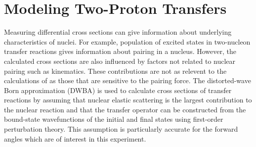\section{Modeling Two-Proton Transfers}

Measuring differential cross sections can give information about underlying characteristics of nuclei.  For example, population of excited \zp states in two-nucleon transfer reactions gives information about pairing in a nucleus.  However, the calculated cross sections are also influenced by factors not related to nuclear pairing such as kinematics.  These contributions are not as relevent to the calculations of \NME as those that are sensitive to the pairing force.  The distorted-wave Born approximation (DWBA) is used to calculate cross sections of transfer reactions by assuming that nuclear elastic scattering is the largest contribution to the nuclear reaction and that the transfer operator can be constructed from the bound-state wavefunctions of the initial and final states using first-order perturbation theory.  This assumption is particularly accurate for the forward angles which are of interest in this experiment.

